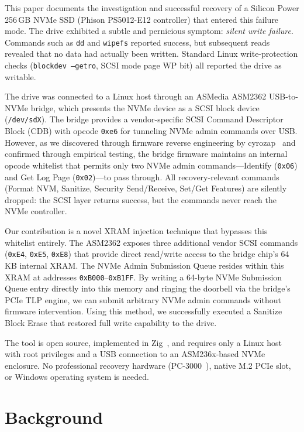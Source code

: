 \documentclass[conference]{IEEEtran}
\begin{document}
This paper documents the investigation and successful recovery of a
Silicon Power 256\,GB NVMe SSD (Phison PS5012-E12 controller) that
entered this failure mode. The drive exhibited a subtle and pernicious
symptom: \emph{silent write failure}. Commands such as \texttt{dd} and
\texttt{wipefs} reported success, but subsequent reads revealed that no
data had actually been written. Standard Linux write-protection checks
(\texttt{blockdev --getro}, SCSI mode page WP bit) all reported the
drive as writable.

The drive was connected to a Linux host through an ASMedia ASM2362
USB-to-NVMe bridge, which presents the NVMe device as a SCSI block
device (\texttt{/dev/sdX}). The bridge provides a vendor-specific SCSI
Command Descriptor Block (CDB) with opcode \texttt{0xe6} for tunneling
NVMe admin commands over USB. However, as we discovered through firmware
reverse engineering by cyrozap~\cite{cyrozap-usb-pcie} and confirmed
through empirical testing, the bridge firmware maintains an internal
opcode whitelist that permits only two NVMe admin commands---Identify
(\texttt{0x06}) and Get Log Page (\texttt{0x02})---to pass through. All
recovery-relevant commands (Format NVM, Sanitize, Security Send/Receive,
Set/Get Features) are silently dropped: the SCSI layer returns success,
but the commands never reach the NVMe controller.

Our contribution is a novel XRAM injection technique that bypasses this
whitelist entirely. The ASM2362 exposes three additional vendor SCSI
commands (\texttt{0xE4}, \texttt{0xE5}, \texttt{0xE8}) that provide
direct read/write access to the bridge chip's 64\,KB internal XRAM. The
NVMe Admin Submission Queue resides within this XRAM at addresses
\texttt{0xB000}--\texttt{0xB1FF}. By writing a 64-byte NVMe Submission
Queue entry directly into this memory and ringing the doorbell via the
bridge's PCIe TLP engine, we can submit arbitrary NVMe admin commands
without firmware intervention. Using this method, we successfully
executed a Sanitize Block Erase that restored full write capability to
the drive.

The tool is open source, implemented in Zig~\cite{zig-lang}, and
requires only a Linux host with root privileges and a USB connection to
an ASM236x-based NVMe enclosure. No professional recovery hardware
(PC-3000~\cite{acelab-phison}), native M.2 PCIe slot, or Windows
operating system is needed.


\section{Background}
\label{sec:background}
\end{document}
